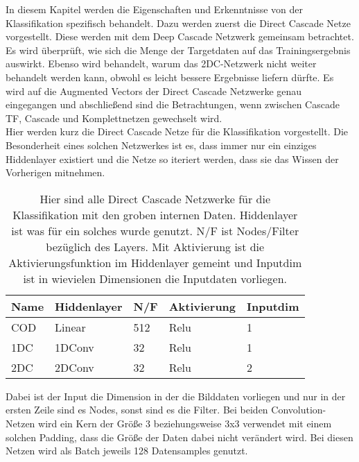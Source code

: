In diesem Kapitel werden die Eigenschaften und Erkenntnisse von der Klassifikation spezifisch behandelt. 
Dazu werden zuerst die Direct Cascade Netze vorgestellt. Diese werden mit dem Deep Cascade Netzwerk gemeinsam betrachtet. 
Es wird überprüft, wie sich die Menge der Targetdaten auf das Trainingsergebnis auswirkt. 
Ebenso wird behandelt, warum das 2DC-Netzwerk nicht weiter behandelt werden kann, obwohl es leicht bessere Ergebnisse liefern dürfte. 
Es wird auf die Augmented Vectors der Direct Cascade Netzwerke genau eingegangen und abschließend sind die Betrachtungen, wenn zwischen 
Cascade TF, Cascade und Komplettnetzen gewechselt wird. \\

Hier werden kurz die Direct Cascade Netze für die Klassifikation vorgestellt. Die Besonderheit eines solchen Netzwerkes ist es, dass 
immer nur ein einziges Hiddenlayer existiert und die Netze so iteriert werden, dass sie das Wissen der Vorherigen mitnehmen. 

\begin{table}[h!]
    \centering    
    \begin{tabular}{l|l|l|l|l}
        \textbf{Name} & \textbf{Hiddenlayer} & \textbf{N/F} & \textbf{Aktivierung} & \textbf{Inputdim} \\
        \hline
        COD & Linear & 512 & Relu & 1 \\
        1DC & 1DConv & 32 & Relu & 1 \\
        2DC & 2DConv & 32 & Relu & 2
    \end{tabular}
    \caption{\small{Hier sind alle Direct Cascade Netzwerke für die Klassifikation mit den groben internen Daten. 
    Hiddenlayer ist was für ein solches wurde genutzt. N/F ist Nodes/Filter bezüglich des Layers. Mit Aktivierung ist die 
    Aktivierungsfunktion im Hiddenlayer gemeint und Inputdim ist in wievielen 
    Dimensionen die Inputdaten vorliegen.}}
        \label{tab:classvor}
\end{table}

Dabei ist der Input die Dimension in der die Bilddaten vorliegen und nur in der ersten Zeile sind es Nodes, sonst sind es die Filter. 
Bei beiden Convolution-Netzen wird ein Kern der Größe 3 beziehungsweise 3x3 verwendet mit einem solchen Padding, dass die Größe der Daten 
dabei nicht verändert wird. Bei diesen Netzen wird als Batch jeweils 128 Datensamples genutzt. 

\iffalse
Das ClassOneDense-Netzwerk besitzt ein Linearlayer mit 512 Nodes als Hiddenlayer 
und der Aktivierungsfunktion Relu. Es nimmt als Input eindimensionale Bilddaten. 

Das 1DConv-Netzwerk besitzt ein 1DConv-Layer als Hiddenlayer mit 32 Filtern, einer Kerngröße von 3 und solchem Padding, dass sich die Größe 
der Daten nicht verändert. Zudem wird die Aktivierungsfunktion Relu genutzt und eindimensionale Bilddaten. 

Das 2DConv-Netzwerk besitzt ein 2DConv-Layer als Hiddenlayer mit 32 Filtern, einer Kerngröße von 3x3 und einem Padding, sodass die Datengröße 
nicht verändert wird. Es wird als Aktivierungsfunktion Relu genutzt und als Input zweidimensionale Bilddaten. 
\fi
